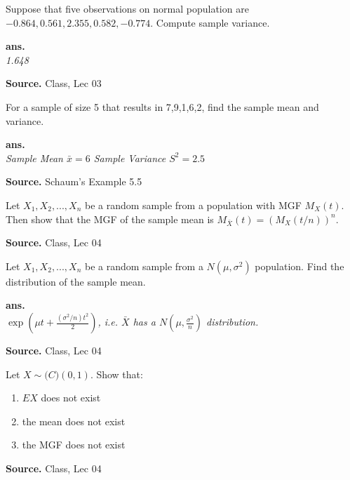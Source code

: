 \documentclass[12pt,twoside]{report}
\newenvironment*{ans}{\textbf{ans.}\space\em\\}{\par}
\newenvironment*{source}{\hfill\scriptsize\textbf{Source.}\space}{\par}
\begin{document}
\begin{samepage}
\begin{ex}
Suppose that five observations on normal population are \\
$-0.864, 0.561, 2.355, 0.582, -0.774$.
Compute sample variance.
\end{ex}
\begin{ans}
1.648
\end{ans}
\begin{source}
Class, Lec 03
\end{source}
\end{samepage}

\begin{samepage}
\begin{ex}
    For a sample of size 5 that results in 7,9,1,6,2, find the sample mean and variance.
\end{ex}
\begin{ans}
Sample Mean $\bar{x} = 6$
Sample Variance $S^2 = 2.5$
\end{ans}
\begin{source}
Schaum's Example 5.5
\end{source}
\end{samepage}

\begin{samepage}
\begin{ex}
    Let $X_1, X_2, ..., X_n$ be a random sample from a population with MGF $M_X(t)$. Then show that the MGF of the sample mean is $M_{\bar{X}} (t) = (M_X (t/n))^n$.
\end{ex}
\begin{source}
Class, Lec 04
\end{source}
\end{samepage}
\begin{samepage}
    \begin{ex}
        Let $X_1, X_2, ..., X_n$ be a random sample from a $N(\mu, \sigma^2)$ population. Find the distribution of the sample mean.
    \end{ex}
    \begin{ans}
        $\exp({\mu t + \frac{(\sigma^2 / n)t^2}{2}})$, i.e. $\bar{X}$ has a $N(\mu, \frac{\sigma^2}{n})$ distribution.
    \end{ans}
    \begin{source}
        Class, Lec 04
    \end{source}
\end{samepage}

\begin{samepage}
\begin{ex}
Let $X \sim \mathcal(C)(0,1)$. Show that:
    \begin{enumerate}
        \item $EX$ does not exist 
        \item the mean does not exist
        \item the MGF does not exist
    \end{enumerate}
\end{ex}
\begin{source}
Class, Lec 04
\end{source}
\end{samepage}
\end{document}
